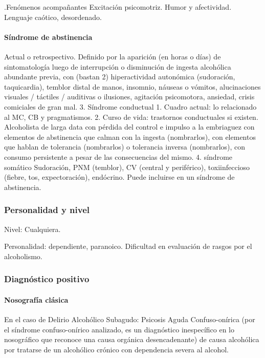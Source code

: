 \documentclass[encares.tex]{subfiles}
\begin{document}
.Fenómenos acompañantes
Excitación psicomotriz. Humor y afectividad. Lenguaje caótico, desordenado.

\paragraph{Síndrome de abstinencia}

Actual o retrospectivo. Definido por la aparición (en horas o días) de sintomatología luego de interrupción o disminución de ingesta alcohólica abundante previa, con (bastan 2) hiperactividad autonómica (sudoración, taquicardia), temblor distal de manos, insomnio, náuseas o vómitos, alucinaciones visuales / táctiles / auditivas o ilusiones, agitación psicomotora, ansiedad, crisis comiciales de gran mal. 3. Síndrome conductual 1. Cuadro actual: lo relacionado al MC, CB y pragmatismos. 2. Curso de vida: trastornos conductuales si existen. Alcoholista de larga data con pérdida del control e impulso a la embriaguez con elementos de abstinencia que calman con la ingesta (nombrarlos), con elementos que hablan de tolerancia (nombrarlos) o tolerancia inversa (nombrarlos), con consumo persistente a pesar de las consecuencias del mismo. 4. síndrome somático Sudoración, PNM (temblor), CV (central y periférico), toxiinfeccioso (fiebre, tos, expectoración), endócrino. Puede incluirse en un síndrome de abstinencia.

\subsubsection*{Personalidad y nivel}
Nivel: Cualquiera.

Personalidad: dependiente, paranoico. Dificultad en evaluación de rasgos por el alcoholismo.
\subsubsection*{Diagnóstico positivo}
\paragraph{Nosografía clásica}
En el caso de Delirio Alcohólico Subagudo: Psicosis \faArrowRight Aguda \faArrowRight Confuso-onírica (por el síndrome confuso-onírico analizado, es un diagnóstico inespecífico en lo nosográfico que reconoce una causa orgánica desencadenante) \faArrowRight de causa alcohólica por tratarse de un alcohólico crónico con dependencia severa al alcohol.
\end{document}
